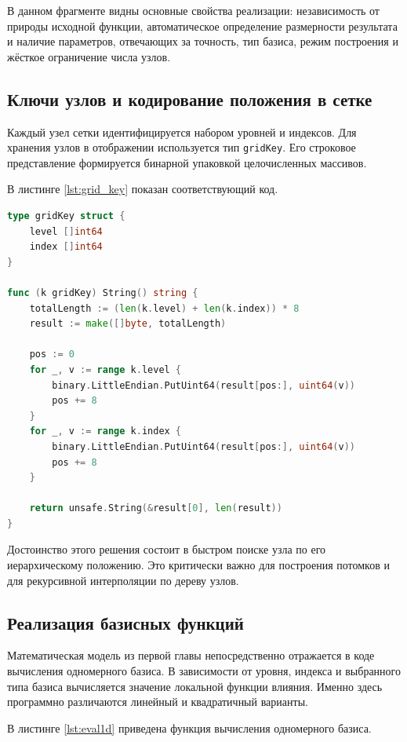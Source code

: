 В данном фрагменте видны основные свойства реализации: независимость от природы исходной функции, автоматическое определение размерности результата и наличие параметров, отвечающих за точность, тип базиса, режим построения и жёсткое ограничение числа узлов.

\subsection{Ключи узлов и кодирование положения в сетке}

Каждый узел сетки идентифицируется набором уровней и индексов. Для хранения узлов в отображении используется тип \texttt{gridKey}. Его строковое представление формируется бинарной упаковкой целочисленных массивов.

В листинге \ref{lst:grid_key} показан соответствующий код.

\begin{lstlisting}[language=Go, caption={Представление ключа узла сетки}, label={lst:grid_key}]
type gridKey struct {
    level []int64
    index []int64
}

func (k gridKey) String() string {
    totalLength := (len(k.level) + len(k.index)) * 8
    result := make([]byte, totalLength)

    pos := 0
    for _, v := range k.level {
        binary.LittleEndian.PutUint64(result[pos:], uint64(v))
        pos += 8
    }
    for _, v := range k.index {
        binary.LittleEndian.PutUint64(result[pos:], uint64(v))
        pos += 8
    }

    return unsafe.String(&result[0], len(result))
}
\end{lstlisting}

Достоинство этого решения состоит в быстром поиске узла по его иерархическому положению. Это критически важно для построения потомков и для рекурсивной интерполяции по дереву узлов.

\subsection{Реализация базисных функций}

Математическая модель из первой главы непосредственно отражается в коде вычисления одномерного базиса. В зависимости от уровня, индекса и выбранного типа базиса вычисляется значение локальной функции влияния. Именно здесь программно различаются линейный и квадратичный варианты.

В листинге \ref{lst:eval1d} приведена функция вычисления одномерного базиса.

